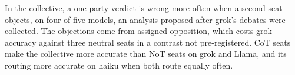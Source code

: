 In the collective, a one-party verdict is wrong more often when a
second seat objects, on four of five models, an analysis proposed after
grok's debates were collected.
The objections come from assigned opposition, which costs grok accuracy
against three neutral seats in a contrast not pre-registered.
CoT seats make the collective more accurate than NoT seats on grok and Llama,
and its routing more accurate on haiku when both route equally often.

